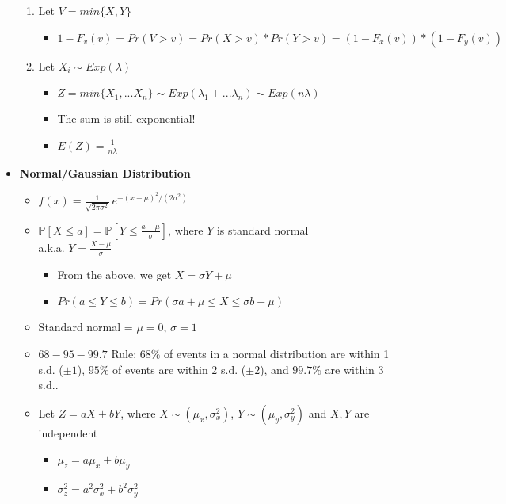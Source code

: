 \documentclass[a4paper]{article}
\begin{document}
\begin{itemize}
\begin{enumerate}
        \item Let $V = min\{X,Y\}$
        \begin{itemize}
            \item $1 - F_v(v) = Pr(V > v) = Pr(X > v) * Pr(Y > v) = (1 - F_x(v))* (1 - F_y(v))$
        \end{itemize}
        \item Let $X_i \sim Exp(\lambda)$
        \begin{itemize}
            \item $Z = min\{X_1, ... X_n\} \sim Exp(\lambda_1 +... \lambda_n) \sim Exp(n\lambda)$
            \item The sum is still exponential!
            \item $E(Z) = \frac{1}{n\lambda}$
        \end{itemize}
    \end{enumerate}
    \item \textbf{Normal/Gaussian Distribution}
    \begin{itemize}
        \item $f(x) = \frac{1}{\sqrt{2\pi\sigma^2}} \,e^{-(x-\mu)^2/(2\sigma^2)}$
        \item ${\mathbb{P}}[X\le a] = {\mathbb{P}}\!\left[Y\le \frac{a-\mu}{\sigma}\right]$, where $Y$ is standard normal\\ a.k.a. $Y = \frac{X- \mu}{\sigma}$
        \begin{itemize}
            \item From the above, we get $X = \sigma Y + \mu$
            \item $Pr(a \leq Y \leq b) = Pr(\sigma a + \mu \leq X \leq \sigma b + \mu)$
        \end{itemize}
        \item Standard normal = $\mu = 0$, $\sigma = 1$
        \item $68-95-99.7$ Rule: $68\%$ of events in a normal distribution are within 1 s.d. ($\pm 1$), $95\%$ of events are within 2 s.d. ($\pm 2$), and $99.7\%$ are within 3 s.d..
        \item Let $Z = aX + bY$, where $X \sim (\mu_x, \sigma^2_x)$, $Y \sim (\mu_y, \sigma^2_y)$ and $X,Y$ are independent
        \begin{itemize}
            \item $\mu_z = a\mu_x + b\mu_y$
            \item $\sigma^2_z = a^2\sigma^2_x + b^2\sigma^2_y$
        \end{itemize}

    \end{itemize}

\end{itemize}
\end{document}
